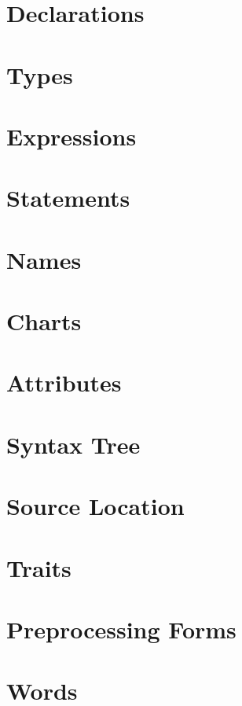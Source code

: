 \documentclass[letterpaper,10pt]{memoir}
\begin{document}
\chapter{Declarations}


\chapter{Types}


\chapter{Expressions}


\chapter{Statements}


\chapter{Names}


\chapter{Charts}


\chapter{Attributes}


\chapter{Syntax Tree}


\chapter{Source Location}


\chapter{Traits}


\chapter{Preprocessing Forms}


\chapter{Words}


\appendix
%

%



\end{document}
